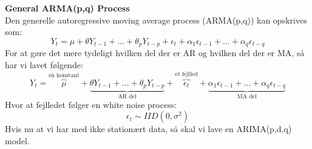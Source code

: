 \documentclass[
  10pt,
]{article}
\begin{document}
\textbf{General ARMA(p,q) Process}\\
Den generelle autoregressive moving average process (ARMA(p,q)) kan
opskrives som:\\
\[Y_t = \mu + \theta Y_{t-1} + \dots + \theta_p Y_{t-p} + \epsilon_t + \alpha_1 \epsilon_{t-1} + \dots + \alpha_q \epsilon_{t-q} \]
For at gøre det mere tydeligt hvilken del der er AR og hvilken del der
er MA, så har vi lavet følgende:\\
\[Y_t =\overbrace{\mu}^{\text{en konstant}} + \underbrace{\theta Y_{t-1} + \dots + \theta_p Y_{t-p}}_\text{AR del} + \overbrace{\epsilon_t}^{\text{et fejlled}} + \underbrace{\alpha_1 \epsilon_{t-1} + \dots + \alpha_q \epsilon_{t-q}}_\text{MA del} \]
Hvor at fejlledet følger en white noise process:\\
\[\epsilon_t \sim IID(0,\sigma^2) \] Hvis nu at vi har med ikke
stationært data, så skal vi lave en ARIMA(p,d,q) model.

\newpage
\end{document}
